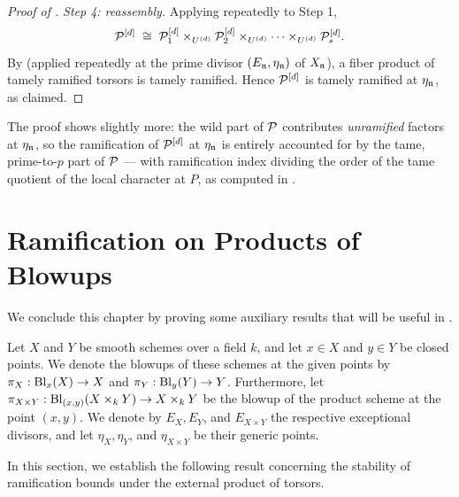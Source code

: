 \begin{proof}[Proof of ]
    \emph{Step 4: reassembly.} Applying 
    repeatedly to Step 1,
    \[
        \mathcal{P}^{[d]}
        \;\cong\;
        \mathcal{P}_1^{[d]} \times_{U^{(d)}} \mathcal{P}_2^{[d]} \times_{U^{(d)}} \cdots
        \times_{U^{(d)}} \mathcal{P}_s^{[d]}.
    \]
    By  (applied repeatedly at the
    prime divisor $(E_{\mathfrak{n}}, \eta_{\mathfrak{n}})$ of $X_{\mathfrak{n}}$), a fiber product of
    tamely ramified torsors is tamely ramified. Hence $\mathcal{P}^{[d]}$ is tamely
    ramified at $\eta_{\mathfrak{n}}$, as claimed.
\end{proof}

\begin{rem*}
    The proof shows slightly more: the wild part of $\mathcal{P}$ contributes
    \emph{unramified} factors at $\eta_{\mathfrak{n}}$, so the ramification of
    $\mathcal{P}^{[d]}$ at $\eta_{\mathfrak{n}}$ is entirely accounted for by the tame,
    prime-to-$p$ part of $\mathcal{P}$ --- with ramification index dividing the order
    of the tame quotient of the local character at $P$, as computed in
    .
\end{rem*}


\section{Ramification on Products of Blowups}\label{subsection:ram_prod_analysis}
We conclude this chapter by proving some auxiliary results that will be useful in .

Let $X$ and $Y$ be smooth schemes over a field $k$, and let $x \in X$ and $y \in Y$ be closed points.
We denote the blowups of these schemes at the given points by
$\pi_X: \operatorname{Bl}_x(X) \to X$ and $\pi_Y: \operatorname{Bl}_y(Y) \to Y$. Furthermore, let $\pi_{X \times Y}: \operatorname{Bl}_{(x,y)}(X \times_k Y) \to X \times_k Y$
be the blowup of the product scheme at the point $(x,y)$.
We denote by $E_X, E_Y$, and $E_{X \times Y}$ the respective exceptional divisors, and let $\eta_X, \eta_Y$, and $\eta_{X \times Y}$ be their generic points.

In this section, we establish the following result concerning the stability of ramification bounds under the external product of torsors.


